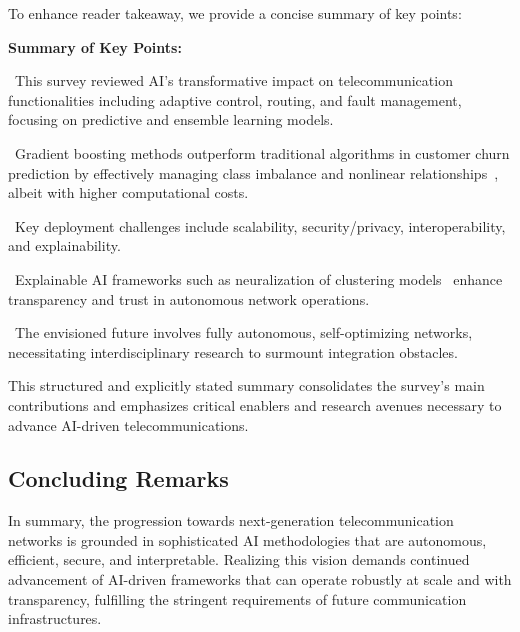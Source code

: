\documentclass[sigconf]{acmart}
\begin{document}
To enhance reader takeaway, we provide a concise summary of key points:

\textbf{Summary of Key Points:}

\textbullet\ This survey reviewed AI’s transformative impact on telecommunication functionalities including adaptive control, routing, and fault management, focusing on predictive and ensemble learning models.

\textbullet\ Gradient boosting methods outperform traditional algorithms in customer churn prediction by effectively managing class imbalance and nonlinear relationships~\cite{ref17}, albeit with higher computational costs.

\textbullet\ Key deployment challenges include scalability, security/privacy, interoperability, and explainability.

\textbullet\ Explainable AI frameworks such as neuralization of clustering models~\cite{ref45} enhance transparency and trust in autonomous network operations.

\textbullet\ The envisioned future involves fully autonomous, self-optimizing networks, necessitating interdisciplinary research to surmount integration obstacles.

This structured and explicitly stated summary consolidates the survey's main contributions and emphasizes critical enablers and research avenues necessary to advance AI-driven telecommunications.

\subsection{Concluding Remarks}

In summary, the progression towards next-generation telecommunication networks is grounded in sophisticated AI methodologies that are autonomous, efficient, secure, and interpretable. Realizing this vision demands continued advancement of AI-driven frameworks that can operate robustly at scale and with transparency, fulfilling the stringent requirements of future communication infrastructures.



\end{document}
